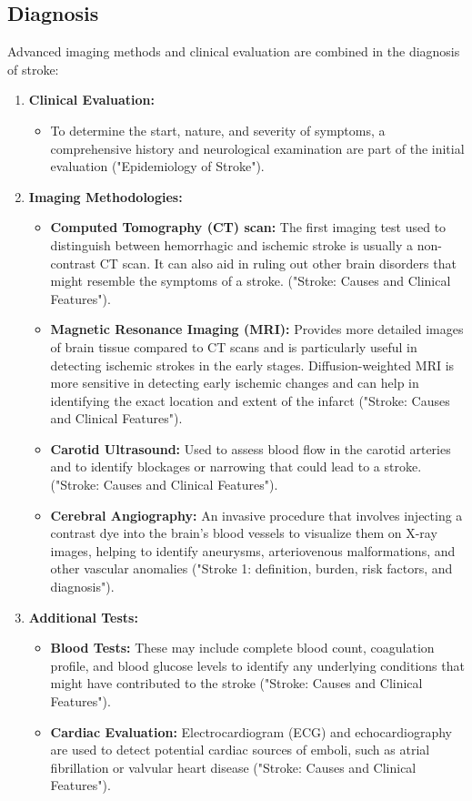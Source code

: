 \subsection{Diagnosis}
\label{sec:diagnosisstroke}
Advanced imaging methods and clinical evaluation are combined in the diagnosis of stroke:
\begin{enumerate}
  \item \textbf{Clinical Evaluation:}
\begin{itemize}
  \item To determine the start, nature, and severity of symptoms, a comprehensive history and neurological examination are part of the initial evaluation ("Epidemiology of Stroke").
\end{itemize}
\item \textbf{Imaging Methodologies:}
\begin{itemize}
  \item \textbf{Computed Tomography (CT) scan:} The first imaging test used to distinguish between hemorrhagic and ischemic stroke is usually a non-contrast CT scan. It can also aid in ruling out other brain disorders that might resemble the symptoms of a stroke. ("Stroke: Causes and Clinical Features"). 
  \item \textbf{Magnetic Resonance Imaging (MRI):} Provides more detailed images of brain tissue compared to CT scans and is particularly useful in detecting ischemic strokes in the early stages. Diffusion-weighted MRI is more sensitive in detecting early ischemic changes and can help in identifying the exact location and extent of the infarct ("Stroke: Causes and Clinical Features").
  \item \textbf{Carotid Ultrasound:} Used to assess blood flow in the carotid arteries and to identify blockages or narrowing that could lead to a stroke. ("Stroke: Causes and Clinical Features").
  \item \textbf{Cerebral Angiography:} An invasive procedure that involves injecting a contrast dye into the brain's blood vessels to visualize them on X-ray images, helping to identify aneurysms, arteriovenous malformations, and other vascular anomalies ("Stroke 1: definition, burden, risk factors, and diagnosis").
\end{itemize}
\item \textbf{Additional Tests:}
\begin{itemize}
  \item \textbf{Blood Tests:} These may include complete blood count, coagulation profile, and blood glucose levels to identify any underlying conditions that might have contributed to the stroke ("Stroke: Causes and Clinical Features").
  \item \textbf{Cardiac Evaluation:} Electrocardiogram (ECG) and echocardiography are used to detect potential cardiac sources of emboli, such as atrial fibrillation or valvular heart disease ("Stroke: Causes and Clinical Features").
\end{itemize}  
\end{enumerate}

